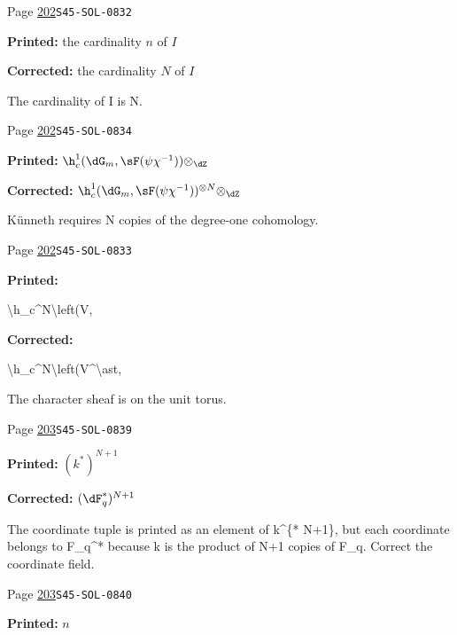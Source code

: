 \begin{description}
\smallskip
\item[\hypertarget{apparatus:EN-0135}{135}] Page \hyperlink{printpage:en:202}{202}\quad\texttt{S45-SOL-0832}
\par\noindent\textbf{Printed:} the cardinality $n$ of $I$
\par\noindent\textbf{Corrected:} the cardinality $N$ of $I$
\par\noindent The cardinality of I is N.
\smallskip
\item[\hypertarget{apparatus:EN-0136}{136}] Page \hyperlink{printpage:en:202}{202}\quad\texttt{S45-SOL-0834}
\par\noindent\textbf{Printed:} \(\h_c^1(\dG_m,\sF(\psi\chi^{-1})) \otimes_\dZ\)
\par\noindent\textbf{Corrected:} \(\h_c^1(\dG_m,\sF(\psi\chi^{-1}))^{\otimes N} \otimes_\dZ\)
\par\noindent Künneth requires N copies of the degree-one cohomology.
\smallskip
\item[\hypertarget{apparatus:EN-0137}{137}] Page \hyperlink{printpage:en:202}{202}\quad\texttt{S45-SOL-0833}
\par\noindent\textbf{Printed:} {\footnotesize\ttfamily\raggedright \textbackslash{}\allowbreak{}h\_\allowbreak{}c\textasciicircum{}\allowbreak{}N\textbackslash{}\allowbreak{}left(\allowbreak{}V,\allowbreak{}}
\par\noindent\textbf{Corrected:} {\footnotesize\ttfamily\raggedright \textbackslash{}\allowbreak{}h\_\allowbreak{}c\textasciicircum{}\allowbreak{}N\textbackslash{}\allowbreak{}left(\allowbreak{}V\textasciicircum{}\allowbreak{}\textbackslash{}\allowbreak{}ast,\allowbreak{}}
\par\noindent The character sheaf is on the unit torus.
\smallskip
\item[\hypertarget{apparatus:EN-0138}{138}] Page \hyperlink{printpage:en:203}{203}\quad\texttt{S45-SOL-0839}
\par\noindent\textbf{Printed:} \((k^\ast)^{N+1}\)
\par\noindent\textbf{Corrected:} \((\dF_q^\ast)^{N+1}\)
\par\noindent The coordinate tuple is printed as an element of k\textasciicircum{}\{* N+1\}, but each coordinate belongs to F\_q\textasciicircum{}* because k is the product of N+1 copies of F\_q. Correct the coordinate field.
\smallskip
\item[\hypertarget{apparatus:EN-0139}{139}] Page \hyperlink{printpage:en:203}{203}\quad\texttt{S45-SOL-0840}
\par\noindent\textbf{Printed:} \(n\)

\end{description}
